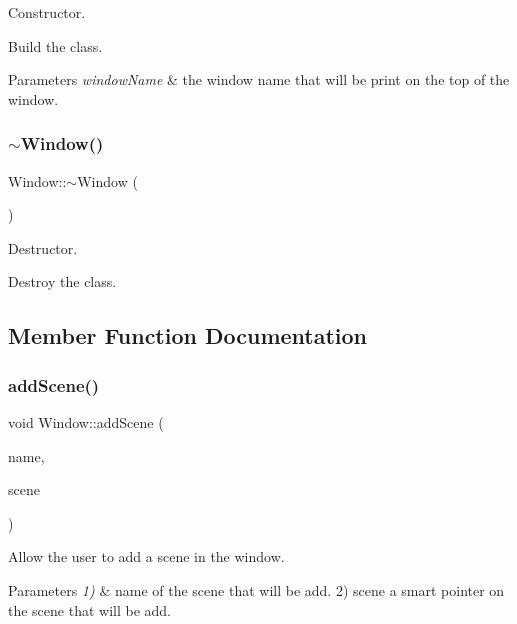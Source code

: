 Constructor. 

Build the class.


\begin{DoxyParams}{Parameters}
{\em \textquotesingle{}window\+Name\textquotesingle{}} & the window name that will be print on the top of the window. \\
\hline
\end{DoxyParams}
\mbox{\label{classWindow_a245d821e6016fa1f6970ccbbedd635f6}} 
\subsubsection{\texorpdfstring{$\sim$\+Window()}{~Window()}}
{\footnotesize\ttfamily Window\+::$\sim$\+Window (\begin{DoxyParamCaption}{ }\end{DoxyParamCaption})}



Destructor. 

Destroy the class. 

\subsection{Member Function Documentation}
\mbox{\label{classWindow_ac9150ac221e5569e677586d5a1123518}} 
\subsubsection{\texorpdfstring{add\+Scene()}{addScene()}}
{\footnotesize\ttfamily void Window\+::add\+Scene (\begin{DoxyParamCaption}\item[{const String \&}]{name,  }\item[{const std\+::shared\+\_\+ptr$<$ \hyperlink{classAScene}{A\+Scene} $>$ \&}]{scene }\end{DoxyParamCaption})}



Allow the user to add a scene in the window. 


\begin{DoxyParams}{Parameters}
{\em 1)} & \textquotesingle{}name\textquotesingle{} of the scene that will be add. 2) \textquotesingle{}scene\textquotesingle{} a smart pointer on the scene that will be add. \\
\hline
\end{DoxyParams}
\mbox{\label{classWindow_af1b2a635ce47d9e841445b8b866a3b28}} 
